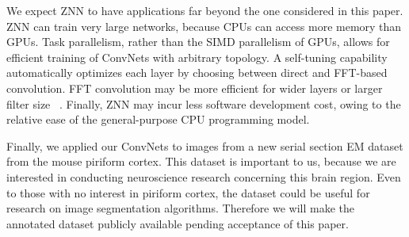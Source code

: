 \documentclass{article} %
\begin{document}
We expect ZNN to have applications far beyond the one considered in
this paper.  ZNN can train very large networks, because CPUs can
access more memory than GPUs. Task parallelism, rather than
the SIMD parallelism of GPUs, allows for efficient training of
ConvNets with arbitrary topology. A self-tuning capability
automatically optimizes each layer by choosing between direct and
FFT-based convolution.  FFT convolution may be more efficient for
wider layers or larger filter size
~\cite{Mathieu2014,Vasilache2015}. Finally, ZNN may incur less
software development cost, owing to the relative ease of the
general-purpose CPU programming model.

Finally, we applied our ConvNets to images from a new serial section
EM dataset from the mouse piriform cortex.  This dataset is important
to us, because we are interested in conducting neuroscience research
concerning this brain region.  Even to those with no interest in
piriform cortex, the dataset could be useful for research on image
segmentation algorithms.  Therefore we will make the annotated dataset
publicly available pending acceptance of this paper.


\end{document}
